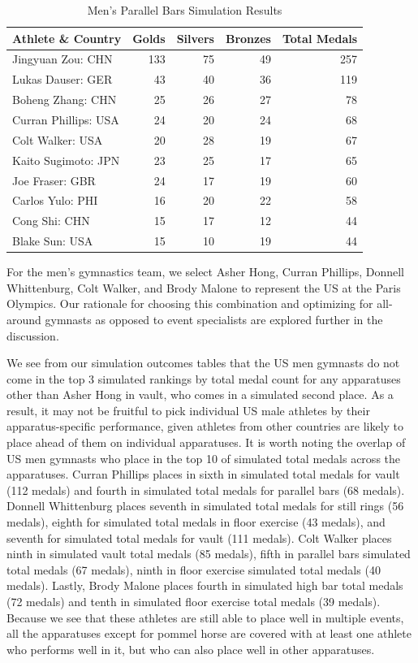 \documentclass[
  10.5pt,
  letterpaper,
  DIV=11,
  numbers=noendperiod]{scrartcl}
\begin{document}
\begin{table}[H]

\caption{Men's Parallel Bars Simulation Results }
\centering
\fontsize{8}{10}\selectfont
\begin{tabular}[t]{l|r|r|r|r}
\hline
Athlete \& Country & Golds & Silvers & Bronzes & Total Medals\\
\hline
Jingyuan Zou: CHN & 133 & 75 & 49 & 257\\
\hline
Lukas Dauser: GER & 43 & 40 & 36 & 119\\
\hline
Boheng Zhang: CHN & 25 & 26 & 27 & 78\\
\hline
Curran Phillips: USA & 24 & 20 & 24 & 68\\
\hline
Colt Walker: USA & 20 & 28 & 19 & 67\\
\hline
Kaito Sugimoto: JPN & 23 & 25 & 17 & 65\\
\hline
Joe Fraser: GBR & 24 & 17 & 19 & 60\\
\hline
Carlos Yulo: PHI & 16 & 20 & 22 & 58\\
\hline
Cong Shi: CHN & 15 & 17 & 12 & 44\\
\hline
Blake Sun: USA & 15 & 10 & 19 & 44\\
\hline
\end{tabular}
\end{table}

For the men's gymnastics team, we select Asher Hong, Curran Phillips,
Donnell Whittenburg, Colt Walker, and Brody Malone to represent the US
at the Paris Olympics. Our rationale for choosing this combination and
optimizing for all-around gymnasts as opposed to event specialists are
explored further in the discussion.

We see from our simulation outcomes tables that the US men gymnasts do
not come in the top 3 simulated rankings by total medal count for any
apparatuses other than Asher Hong in vault, who comes in a simulated
second place. As a result, it may not be fruitful to pick individual US
male athletes by their apparatus-specific performance, given athletes
from other countries are likely to place ahead of them on individual
apparatuses. It is worth noting the overlap of US men gymnasts who place
in the top 10 of simulated total medals across the apparatuses. Curran
Phillips places in sixth in simulated total medals for vault (112
medals) and fourth in simulated total medals for parallel bars (68
medals). Donnell Whittenburg places seventh in simulated total medals
for still rings (56 medals), eighth for simulated total medals in floor
exercise (43 medals), and seventh for simulated total medals for vault
(111 medals). Colt Walker places ninth in simulated vault total medals
(85 medals), fifth in parallel bars simulated total medals (67 medals),
ninth in floor exercise simulated total medals (40 medals). Lastly,
Brody Malone places fourth in simulated high bar total medals (72
medals) and tenth in simulated floor exercise total medals (39 medals).
Because we see that these athletes are still able to place well in
multiple events, all the apparatuses except for pommel horse are covered
with at least one athlete who performs well in it, but who can also
place well in other apparatuses.
\end{document}
